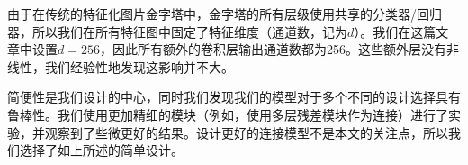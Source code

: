 \documentclass[../main.tex]{subfile}
\begin{document}
由于在传统的特征化图片金字塔中，金字塔的所有层级使用共享的分类器/回归器，所以我们在所有特征图中固定了特征维度（通道数，记为$d$）。我们在这篇文章中设置$d=256$，因此所有额外的卷积层输出通道数都为256。这些额外层没有非线性，我们经验性地发现这影响并不大。

简便性是我们设计的中心，同时我们发现我们的模型对于多个不同的设计选择具有鲁棒性。我们使用更加精细的模块（例如，使用多层残差模块\cite{resnet}作为连接）进行了实验，并观察到了些微更好的结果。设计更好的连接模型不是本文的关注点，所以我们选择了如上所述的简单设计。
\end{document}
